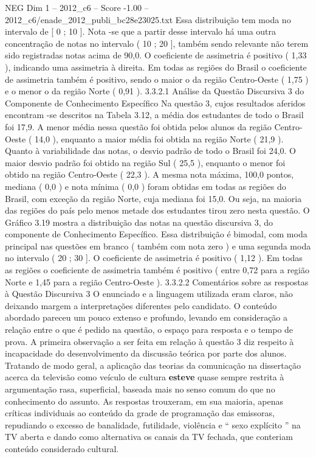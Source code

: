 \begin{textsample}{NEG Dim 1 – 2012\_c6 – Score -1.00 – 2012\_c6/enade\_2012\_publi\_bc28e23025.txt}
Essa distribuição tem moda no intervalo de [ 0 ; 10 ].
Nota -se que a partir desse intervalo há uma outra concentração de notas no intervalo ( 10 ; 20 ], também sendo relevante não terem sido registradas notas acima de 90,0.
O coeficiente de assimetria é positivo ( 1,33 ), indicando uma assimetria à direita.
Em todas as regiões do Brasil o coeficiente de assimetria também é positivo, sendo o maior o da região Centro-Oeste ( 1,75 ) e o menor o da região Norte ( 0,91 ). 3.3.2.1 Análise da Questão Discursiva 3 do Componente de Conhecimento Específico Na questão 3, cujos resultados aferidos encontram -se descritos na Tabela 3.12, a média dos estudantes de todo o Brasil foi 17,9.
A menor média nessa questão foi obtida pelos alunos da região Centro-Oeste ( 14,0 ), enquanto a maior média foi obtida na região Norte ( 21,9 ).
Quanto à variabilidade das notas, o desvio padrão de todo o Brasil foi 24,0.
O maior desvio padrão foi obtido na região Sul ( 25,5 ), enquanto o menor foi obtido na região Centro-Oeste ( 22,3 ).
A mesma nota máxima, 100,0 pontos, mediana ( 0,0 ) e nota mínima ( 0,0 ) foram obtidas em todas as regiões do Brasil, com exceção da região Norte, cuja mediana foi 15,0.
Ou seja, na maioria das regiões do país pelo menos metade dos estudantes tirou zero nesta questão.
O Gráfico 3.19 mostra a distribuição das notas na questão discursiva 3, do componente de Conhecimento Específico.
Essa distribuição é bimodal, com moda principal nas questões em branco ( também com nota zero ) e uma segunda moda no intervalo ( 20 ; 30 ].
O coeficiente de assimetria é positivo ( 1,12 ).
Em todas as regiões o coeficiente de assimetria também é positivo ( entre 0,72 para a região Norte e 1,45 para a região Centro-Oeste ). 3.3.2.2 Comentários sobre as respostas à Questão Discursiva 3 O enunciado e a linguagem utilizada eram claros, não deixando margem a interpretações diferentes pelo candidato.
O conteúdo abordado pareceu um pouco extenso e profundo, levando em consideração a relação entre o que é pedido na questão, o espaço para resposta e o tempo de prova.
A primeira observação a ser feita em relação à questão 3 diz respeito à incapacidade do desenvolvimento da discussão teórica por parte dos alunos.
Tratando de modo geral, a aplicação das teorias da comunicação na dissertação acerca da televisão como veículo de cultura \textbf{esteve} quase sempre restrita à argumentação rasa, superficial, baseada mais no senso comum do que no conhecimento do assunto.
As respostas trouxeram, em sua maioria, apenas críticas individuais ao conteúdo da grade de programação das emissoras, repudiando o excesso de banalidade, futilidade, violência e “ sexo explícito ” na TV aberta e dando como alternativa os canais da TV fechada, que conteriam conteúdo considerado cultural.

\end{textsample}
